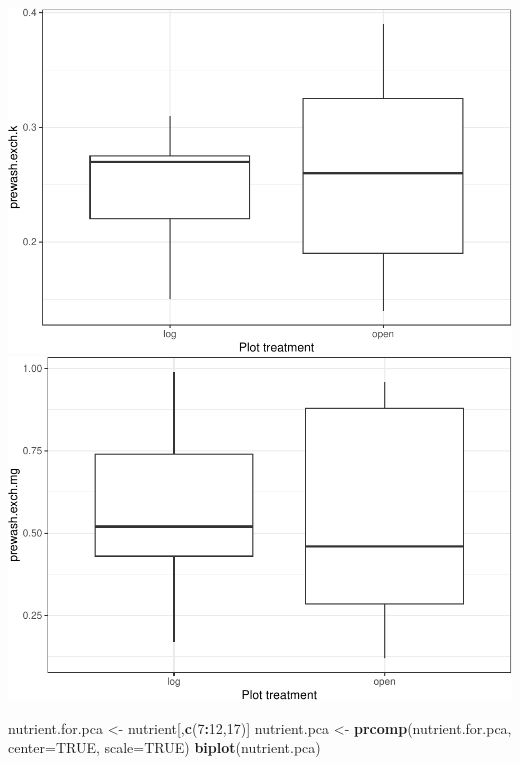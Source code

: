 \documentclass[
]{article}
\newenvironment{Shaded}{\begin{snugshade}}{\end{snugshade}}
\newcommand{\AttributeTok}[1]{\textcolor[rgb]{0.13,0.29,0.53}{#1}}
\newcommand{\ConstantTok}[1]{\textcolor[rgb]{0.56,0.35,0.01}{#1}}
\newcommand{\DecValTok}[1]{\textcolor[rgb]{0.00,0.00,0.81}{#1}}
\newcommand{\FunctionTok}[1]{\textcolor[rgb]{0.13,0.29,0.53}{\textbf{#1}}}
\newcommand{\NormalTok}[1]{#1}
\newcommand{\OtherTok}[1]{\textcolor[rgb]{0.56,0.35,0.01}{#1}}
\newcommand{\SpecialCharTok}[1]{\textcolor[rgb]{0.81,0.36,0.00}{\textbf{#1}}}
\begin{document}
\includegraphics{log-project-aubrie-winnie_files/figure-latex/unnamed-chunk-8-10.pdf}
\includegraphics{log-project-aubrie-winnie_files/figure-latex/unnamed-chunk-8-11.pdf}

\begin{Shaded}
\begin{Highlighting}[]
\NormalTok{nutrient.for.pca }\OtherTok{\textless{}{-}}\NormalTok{ nutrient[,}\FunctionTok{c}\NormalTok{(}\DecValTok{7}\SpecialCharTok{:}\DecValTok{12}\NormalTok{,}\DecValTok{17}\NormalTok{)]}
\NormalTok{nutrient.pca }\OtherTok{\textless{}{-}} \FunctionTok{prcomp}\NormalTok{(nutrient.for.pca, }\AttributeTok{center=}\ConstantTok{TRUE}\NormalTok{, }\AttributeTok{scale=}\ConstantTok{TRUE}\NormalTok{)}
\FunctionTok{biplot}\NormalTok{(nutrient.pca)}
\end{Highlighting}
\end{Shaded}
\end{document}
